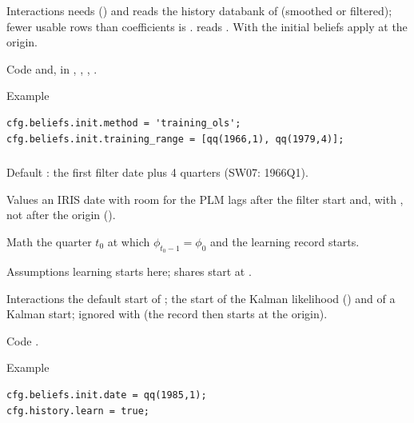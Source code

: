 \documentclass[11pt,a4paper]{article}
\DeclareRobustCommand{\codem}[1]{\texttt{\detokenize{#1}}}
\newenvironment{optspec}%
  {\begin{description}[style=sameline,leftmargin=2.7cm,labelwidth=2.5cm,font=\normalfont\itshape]}%
  {\end{description}}
\begin{document}
\begin{optspec}
  \item[Interactions]  needs 
        () and reads the history databank of
         (smoothed or filtered); fewer usable rows than coefficients is
        .  reads . With
         the initial beliefs apply at the origin.
  \item[Code]  and, in , ,
        , .
  \item[Example]
\begin{lstlisting}
cfg.beliefs.init.method = 'training_ols';
cfg.beliefs.init.training_range = [qq(1966,1), qq(1979,4)];
\end{lstlisting}
\end{optspec}

\subsubsection{\texorpdfstring{\codem{beliefs.init.date}}{beliefs.init.date}}\label{opt:beliefs-init-date}
\begin{optspec}
  \item[Default] \code{[]}: the first filter date plus 4 quarters (SW07: 1966Q1).
  \item[Values] an IRIS date with room for the PLM lags after the filter start and, with
        , not after the origin
        ().
  \item[Math] the quarter $t_0$ at which $\phi_{t_0-1} = \phi_0$ and the learning record starts.
  \item[Assumptions] learning starts here; shares start at .
  \item[Interactions] the default start of ; the start of the
        Kalman likelihood () and of a  Kalman start; ignored
        with  (the record then starts at the origin).
  \item[Code] .
  \item[Example]
\begin{lstlisting}
cfg.beliefs.init.date = qq(1985,1);
cfg.history.learn = true;
\end{lstlisting}
\end{optspec}
\end{document}

